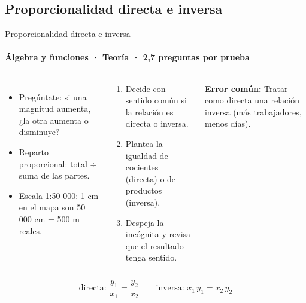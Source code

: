 \documentclass[aspectratio=169,11pt]{beamer}
\newlength{\ajustealto}
\newenvironment{ajustar}[1][0.74\textheight]
  {\setlength{\ajustealto}{#1}\begin{lrbox}{\ajustecaja}\begin{minipage}{\textwidth}}
  {\end{minipage}\end{lrbox}%
   \ifdim\dimexpr\ht\ajustecaja+\dp\ajustecaja\relax>\ajustealto
     \resizebox*{!}{\ajustealto}{\usebox{\ajustecaja}}\else\usebox{\ajustecaja}\fi}
\begin{document}
\subsection{Proporcionalidad directa e inversa}

\begin{frame}{Proporcionalidad directa e inversa}
\label{tema-m1-proporcionalidad}
\framesubtitle{Álgebra y funciones · Teoría · 2,7 preguntas por prueba}
\begin{ajustar}
\begin{columns}[T,onlytextwidth]
\begin{itemize}\footnotesize
\item Pregúntate: si una magnitud aumenta, ¿la otra aumenta o disminuye?
\item Reparto proporcional: total $\div$ suma de las partes.
\item Escala 1:50 000: 1 cm en el mapa son 50 000 cm = 500 m reales.
\end{itemize}
\begin{cajaregla}\scriptsize \begin{enumerate}\item Decide con sentido común si la relación es directa o inversa.\item Plantea la igualdad de cocientes (directa) o de productos (inversa).\item Despeja la incógnita y revisa que el resultado tenga sentido.\end{enumerate}\end{cajaregla}
\begin{notagris}\scriptsize \textbf{Error común:} Tratar como directa una relación inversa (más trabajadores, menos días).\end{notagris}
\end{columns}
\begin{cajaclave}\footnotesize
\[\text{directa: } \frac{y_1}{x_1}=\frac{y_2}{x_2} \quad\quad \text{inversa: } x_1\,y_1=x_2\,y_2\]
\end{cajaclave}
\end{ajustar}
\end{frame}
\end{document}
